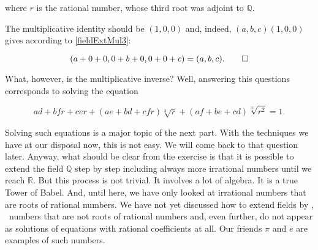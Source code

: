 \documentclass[tikz]{scrreprt}
\begin{document}
where $r$ is the rational number, whose third root was
adjoint to $\mathbb{Q}$.

The multiplicative identity should be $(1,0,0)$ and, indeed,
$(a,b,c)(1,0,0)$ gives according to \ref{fieldExtMul3}:

\[
(a+0+0,0+b+0,0+0+c) = (a,b,c).\qed
\]

What, however, is the multiplicative inverse?
Well, answering this questions corresponds to solving
the equation

\begin{equation}
ad+bfr+cer + (ae+bd+cfr)\sqrt[3]{r} + (af+be+cd)\sqrt[3]{r^2} = 1.
\end{equation}

Solving such equations is a major topic of the next part.
With the techniques we have at our disposal now,
this is not easy. We will come back to that question later.
Anyway, what should be clear from the exercise is
that it is possible to extend the field $\mathbb{Q}$
step by step including always more irrational numbers
until we reach $\mathbb{R}$.
But this process is not trivial. It involves a lot of algebra.
It is a true Tower of Babel.
And, until here, we have only looked at irrational numbers
that are roots of rational numbers.
We have not yet discussed how to extend fields by 
, \ie\ numbers that
are not roots of rational numbers and, even further,
do not appear as solutions of equations with
rational coefficients at all. 
Our friends $\pi$ and $e$ are
examples of such numbers. 

\end{document}
